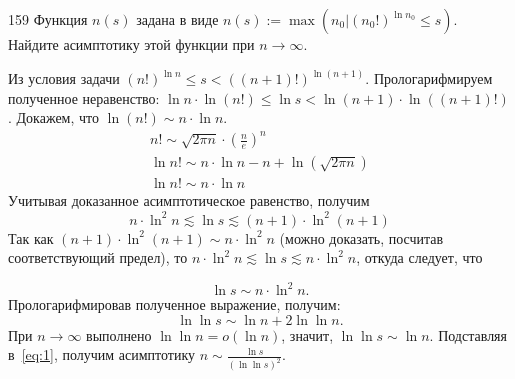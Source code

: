 \begin{task}{159}
Функция $n(s)$ задана в виде $n(s):=\max(n_0 | (n_0!)^{\ln{n_0}}\leq s)$. Найдите асимптотику этой функции при $n \rightarrow \infty$.
\end{task}

\begin{solution}
Из условия задачи $(n!)^{\ln{n}}\leq s < ((n+1)!)^{\ln(n+1)}$. Прологарифмируем полученное неравенство: $\ln{n}\cdot \ln(n!) \leq \ln{s} < \ln(n + 1)\cdot \ln((n + 1)!)$.
Докажем, что $\ln(n!) \sim n\cdot \ln{n}$.
\begin{equation*}
    \begin{split}
        n! \sim \sqrt{2\pi n}\cdot\left(\frac{n}{e}\right)^n\\
        \ln{n!} \sim n\cdot\ln{n}-n+\ln(\sqrt{2\pi n})\\
        \ln{n!} \sim n\cdot\ln{n}
    \end{split}
\end{equation*} Учитывая доказанное асимптотическое равенство, получим
\[n\cdot \ln^2{n}\lesssim \ln{s} \lesssim (n + 1)\cdot\ln^2(n + 1)\]
Так как $(n + 1)\cdot\ln^2(n + 1) \sim n\cdot \ln^2{n}$ (можно доказать, посчитав соответствующий предел), то $n\cdot \ln^2{n}\lesssim \ln{s} \lesssim n\cdot \ln^2{n}$, откуда следует, что 

\begin{equation}
\ln{s}\sim n\cdot \ln^2{n}. \label{eq:1}
\end{equation}
Прологарифмировав полученное выражение, получим:
\[\ln{\ln{s}}\sim \ln{n}+2\ln{\ln{n}}.\]
При $n\rightarrow \infty$ выполнено $\ln{\ln{n}} = o(\ln{n})$, значит, $\ln{\ln{s}}\sim \ln{n}$. Подставляя в~\eqref{eq:1}, получим асимптотику $n \sim \frac{\ln{s}}{(\ln{\ln{s}})^2}$.
\end{solution}